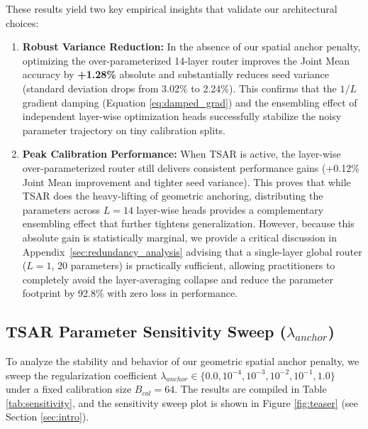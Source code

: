 These results yield two key empirical insights that validate our architectural choices:
\begin{enumerate}
  \item \textbf{Robust Variance Reduction:} In the absence of our spatial anchor penalty,
optimizing the over-parameterized 14-layer router improves the Joint Mean accuracy by
\textbf{+1.28\%} absolute and substantially reduces seed variance (standard deviation drops from
3.02\% to 2.24\%). This confirms that the $1/L$ gradient damping (Equation \ref{eq:damped_grad}) and
the ensembling effect of independent layer-wise optimization heads successfully stabilize the noisy
parameter trajectory on tiny calibration splits.
  \item \textbf{Peak Calibration Performance:} When TSAR is active, the layer-wise
over-parameterized router still delivers consistent performance gains (+0.12\% Joint Mean
improvement and tighter seed variance). This proves that while TSAR does the heavy-lifting of
geometric anchoring, distributing the parameters across $L=14$ layer-wise heads provides a
complementary ensembling effect that further tightens generalization. However, because this absolute
gain is statistically marginal, we provide a critical discussion in
Appendix~\ref{sec:redundancy_analysis} advising that a single-layer global router ($L=1$, 20
parameters) is practically sufficient, allowing practitioners to completely avoid the
layer-averaging collapse and reduce the parameter footprint by 92.8\% with zero loss in performance.
\end{enumerate}

\subsection{TSAR Parameter Sensitivity Sweep ($\lambda_{anchor}$)}
To analyze the stability and behavior of our geometric spatial anchor penalty, we sweep the
regularization coefficient $\lambda_{anchor} \in \{0.0, 10^{-4}, 10^{-3}, 10^{-2}, 10^{-1}, 1.0\}$
under a fixed calibration size $B_{cal}=64$. The results are compiled in Table
\ref{tab:sensitivity}, and the sensitivity sweep plot is shown in Figure \ref{fig:teaser} (see
Section \ref{sec:intro}).

